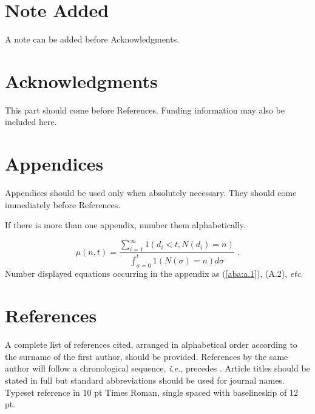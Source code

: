 \documentclass{ws-jai}
\begin{document}
\section*{Note Added}
A note can be added before Acknowledgments.

\section*{Acknowledgments}
This part should come before References. Funding information may also be included here.

\section*{Appendices}
Appendices should be used only
when absolutely necessary. They should come immediately before
References.

\appendix{} %
If there is more than one appendix, number them alphabetically.

\noindent
\begin{equation}
\mu(n, t) = \frac{\displaystyle\sum^\infty_{i=1} 1(d_i < t, N(d_i) = n)}
{\displaystyle\int^t_{\sigma=0} 1(N(\sigma) = n)d\sigma}\,\,
.\label{aba:a.1}
\end{equation}
Number displayed equations occurring in the appendix as (\ref{aba:a.1}),
(A.2), {\it etc.}

\section*{References}
\noindent A complete list of references cited, arranged in
alphabetical order according to the surname of the first author,
should be provided. References by the same author will follow a
chronological sequence, {\it i.e.}, \cite{Lie00} precedes \cite{Lie01}.
Article titles should be stated in full but standard abbreviations
should be used for journal names. Typeset reference in 10 pt Times
Roman, single spaced with baselineskip of 12 pt.
\end{document}
